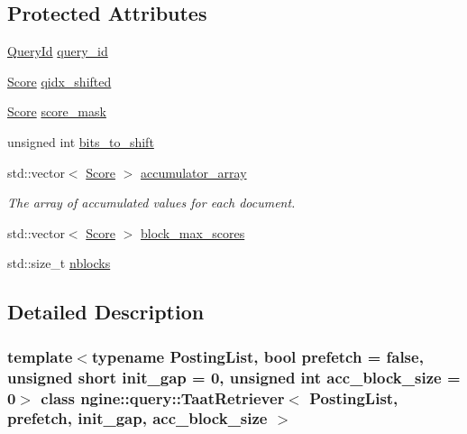 \subsection*{Protected Attributes}
\begin{DoxyCompactItemize}
\item 
\hyperlink{namespacengine_1_1query_a3deddbc36af48dca2072f880a752b001}{Query\+Id} \hyperlink{classngine_1_1query_1_1TaatRetriever_a32220db1f5ce3701ef674071551c3179}{query\+\_\+id}
\item 
\hyperlink{structngine_1_1Score}{Score} \hyperlink{classngine_1_1query_1_1TaatRetriever_a6886c978fc175aa197c0ab2cecb94756}{qidx\+\_\+shifted}
\item 
\hyperlink{structngine_1_1Score}{Score} \hyperlink{classngine_1_1query_1_1TaatRetriever_a2aadff690e54f22078b1bca5102c8bd0}{score\+\_\+mask}
\item 
unsigned int \hyperlink{classngine_1_1query_1_1TaatRetriever_ace294f37e49fcb504681c94a46917bb1}{bits\+\_\+to\+\_\+shift}
\item 
std\+::vector$<$ \hyperlink{structngine_1_1Score}{Score} $>$ \hyperlink{classngine_1_1query_1_1TaatRetriever_afbc8b5606edd1c8709791437e2a95d45}{accumulator\+\_\+array}
\begin{DoxyCompactList}\small\item\em The array of accumulated values for each document. \end{DoxyCompactList}\item 
std\+::vector$<$ \hyperlink{structngine_1_1Score}{Score} $>$ \hyperlink{classngine_1_1query_1_1TaatRetriever_a63715b843da0889a264365a3379418fa}{block\+\_\+max\+\_\+scores}
\item 
std\+::size\+\_\+t \hyperlink{classngine_1_1query_1_1TaatRetriever_a6562a6b51152f7e28c65de1905a8c24d}{nblocks}
\end{DoxyCompactItemize}


\subsection{Detailed Description}
\subsubsection*{template$<$typename Posting\+List, bool prefetch = false, unsigned short init\+\_\+gap = 0, unsigned int acc\+\_\+block\+\_\+size = 0$>$\newline
class ngine\+::query\+::\+Taat\+Retriever$<$ Posting\+List, prefetch, init\+\_\+gap, acc\+\_\+block\+\_\+size $>$}

